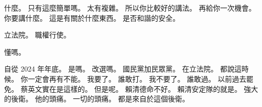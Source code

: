 \hypertarget{c01:cue:1580}{}什麼。
\hypertarget{c01:cue:1581}{}只有這麼簡單嗎。
\hypertarget{c01:cue:1582}{}太有複雜。
\hypertarget{c01:cue:1583}{}所以你比較好的講法。
\hypertarget{c01:cue:1584}{}再給你一次機會。
\hypertarget{c01:cue:1585}{}你要講什麼。
\hypertarget{c01:cue:1586}{}這是有關於什麼東西。
\hypertarget{c01:cue:1587}{}是否和諧的安全。

\hypertarget{c01:cue:1588}{}立法院。
\hypertarget{c01:cue:1589}{}職權行使。

\hypertarget{c01:cue:1590}{}懂嗎。

\hypertarget{c01:cue:1591}{}自從 2024 年年底。
\hypertarget{c01:cue:1592}{}是嗎。
\hypertarget{c01:cue:1593}{}改選嗎。
\hypertarget{c01:cue:1594}{}國民黨加民眾黨。
\hypertarget{c01:cue:1595}{}在立法院。
\hypertarget{c01:cue:1596}{}都說這時候。
\hypertarget{c01:cue:1597}{}你一定會再有不能。
\hypertarget{c01:cue:1598}{}我要了。
\hypertarget{c01:cue:1599}{}誰敢打。
\hypertarget{c01:cue:1600}{}我不要了。
\hypertarget{c01:cue:1601}{}誰敢過。
\hypertarget{c01:cue:1602}{}以前過去罷免。
\hypertarget{c01:cue:1603}{}蔡英文實在是這樣的。
\hypertarget{c01:cue:1604}{}但是呢。
\hypertarget{c01:cue:1605}{}賴清德命不好。
\hypertarget{c01:cue:1606}{}賴清安定隊的就是。
\hypertarget{c01:cue:1607}{}強大的後衛。
\hypertarget{c01:cue:1608}{}他的頭痛。
\hypertarget{c01:cue:1609}{}一切的頭痛。
\hypertarget{c01:cue:1610}{}都是來自於這個後衛。

